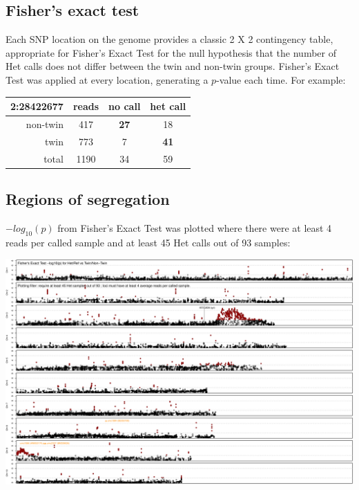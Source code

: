 \documentclass[maize,portrait]{a0poster}
\newlength{\figwidth}
\begin{document}
\begin{multicols}{3}
  \subsection*{Fisher's exact test}

  Each SNP location on the genome provides a classic 2 X 2 contingency table, appropriate for Fisher's Exact Test
  for the null hypothesis that the number of Het calls does not differ between the twin and non-twin groups.
  Fisher's Exact Test was applied at every location, generating a $p$-value each time. For example:

  \begin{center}
    \begin{tabular}{|r|c||c|c|}
      \hline
      \textbf{2:28422677} & reads & no call & het call \\
      \hline
      \hline
      non-twin   & 417   & \textbf{27} & 18 \\
      \hline
      twin       & 773   & 7  & \textbf{41} \\
      \hline
      \hline
      total      & 1190  & 34 & 59 \\
      \hline
    \end{tabular}
  \end{center}


  \subsection*{Regions of segregation}

  $-log_{10}(p)$ from Fisher's Exact Test was plotted where there were at least 4 reads per called sample and at least 45 Het calls out of 93 samples:
  
  \begin{center}
    \includegraphics[width=\figwidth]{Fisher-Het-45}
  \end{center}


\end{multicols}
\end{document}
